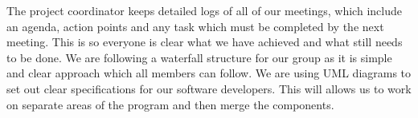 \documentclass[11pt]{article}
\begin{document}
		The project coordinator keeps detailed logs of all of our meetings, which include an agenda, action points and any task which must be completed by the next meeting. This is so everyone is clear what we have achieved and what still needs to be done. We are following a waterfall structure for our group as it is simple and clear approach which all members can follow. 
		We are using UML diagrams to set out clear specifications for our software developers. 
		This will allows us to work on separate areas of the program and then merge the components.  
	
%	
		



	
\end{document}
